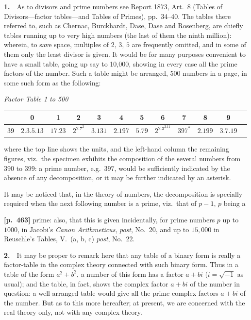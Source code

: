 \documentclass[11pt,a4paper]{article}
\begin{document}
\textbf{1.}\ \ As to divisors and prime numbers see Report 1873, Art.~8 (Tables of Divisors---factor tables---and Tables of Primes), pp.~34--40.   The tables there referred to, such as Chernac, Burckhardt, Dase, Dase and Rosenberg, are chiefly tables running up to very high numbers (the last of them the ninth million): wherein, to save space, multiples of $2,\,3,\,5$ are frequently omitted, and in some of them only the least divisor is given.   It would be for many purposes convenient to have a small table, going up say to 10,000, showing in every case all the prime factors of the number.   Such a table might be arranged, $500$ numbers in a page, in some such form as the following:

\begin{center}
\textit{Factor Table 1 to 500}
\end{center}

\begin{center}
\renewcommand{\arraystretch}{1.1}
\begin{tabular}{c|ccccccccccc}
\hline
 & 0 & 1 & 2 & 3 & 4 & 5 & 6 & 7 & 8 & 9 \\
\hline
39 & $2.3.5.13$ & $17.23$ & $2^2.7^2$ & $3.131$ & $2.197$ & $5.79$ & $2^2.3^2.11$ & $397^{*}$ & $2.199$ & $3.7.19$ \\
\hline
\end{tabular}
\end{center}

\noindent where the top line shows the units, and the left-hand column the remaining figures, viz.\ the specimen exhibits the composition of the several numbers from $390$ to $399$: a prime number, e.g.\ $397$, would be sufficiently indicated by the absence of any decomposition, or it may be further indicated by an asterisk.

It may be noticed that, in the theory of numbers, the decomposition is specially required when the next following number is a prime, viz.\ that of $p-1$, $p$ being a

\bigskip
\noindent\textbf{[p.~463]}\quad
prime: also, that this is given incidentally, for prime numbers $p$ up to $1000$, in Jacobi's \textit{Canon Arithmeticus}, \textit{post}, No.~20, and up to $15{,}000$ in Reuschle's Tables, V.~(a, b, c) \textit{post}, No.~22.

\textbf{2.}\ \ It may be proper to remark here that any table of a binary form is really a factor-table in the complex theory connected with such binary form.   Thus in a table of the form $a^2+b^2$, a number of this form has a factor $a+bi$ ($i=\sqrt{-1}$ as usual); and the table, in fact, shows the complex factor $a+bi$ of the number in question: a well arranged table would give all the prime complex factors $a+bi$ of the number.   But as to this more hereafter; at present, we are concerned with the real theory only, not with any complex theory.
\end{document}
